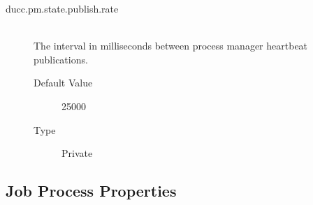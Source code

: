 \begin{description}
      \item[ducc.pm.state.publish.rate] \hfill \\
        The interval in milliseconds between process manager heartbeat publications.
        \begin{description}
        \item[Default Value] 25000 
        \item[Type] Private 
        \end{description}
        

      \end{description}
      

\subsection{Job Process Properties}

